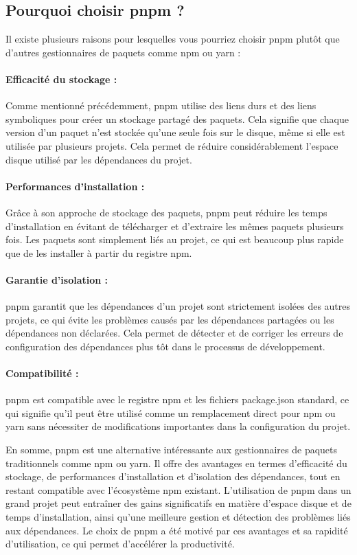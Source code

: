 \subsection{Pourquoi choisir pnpm ?}

Il existe plusieurs raisons pour lesquelles vous pourriez choisir \gls{pnpm} plutôt que d'autres gestionnaires de paquets comme \gls{npm} ou yarn :

\paragraph{Efficacité du stockage :} Comme mentionné précédemment, \gls{pnpm} utilise des liens durs et des liens symboliques pour créer un stockage partagé des paquets. Cela signifie que chaque version d'un paquet n'est stockée qu'une seule fois sur le disque, même si elle est utilisée par plusieurs projets. Cela permet de réduire considérablement l'espace disque utilisé par les dépendances du projet.
\paragraph{Performances d'installation :} Grâce à son approche de stockage des paquets, \gls{pnpm} peut réduire les temps d'installation en évitant de télécharger et d'extraire les mêmes paquets plusieurs fois. Les paquets sont simplement liés au projet, ce qui est beaucoup plus rapide que de les installer à partir du registre npm.
\paragraph{Garantie d'isolation :} \gls{pnpm} garantit que les dépendances d'un projet sont strictement isolées des autres projets, ce qui évite les problèmes causés par les dépendances partagées ou les dépendances non déclarées. Cela permet de détecter et de corriger les erreurs de configuration des dépendances plus tôt dans le processus de développement.
\paragraph{Compatibilité :} \gls{pnpm} est compatible avec le registre \gls{npm} et les fichiers package.json standard, ce qui signifie qu'il peut être utilisé comme un remplacement direct pour \gls{npm} ou yarn sans nécessiter de modifications importantes dans la configuration du projet.

En somme, \gls{pnpm} est une alternative intéressante aux gestionnaires de paquets traditionnels comme \gls{npm} ou yarn. Il offre des avantages en termes d'efficacité du stockage, de performances d'installation et d'isolation des dépendances, tout en restant compatible avec l'écosystème \gls{npm} existant. L'utilisation de \gls{pnpm} dans un grand projet peut entraîner des gains significatifs en matière d'espace disque et de temps d'installation, ainsi qu'une meilleure gestion et détection des problèmes liés aux dépendances. Le choix de \gls{pnpm} a été motivé par ces avantages et sa rapidité d'utilisation, ce qui permet d'accélérer la productivité.


